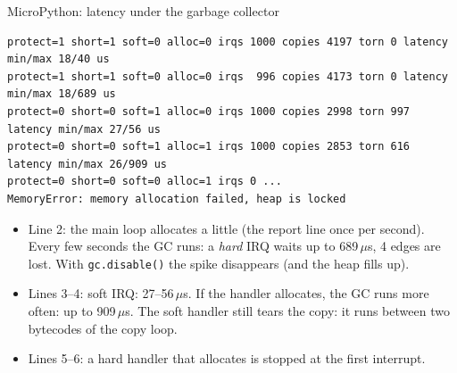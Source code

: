 \begin{frame}[fragile]{MicroPython: latency under the garbage collector}
  \footnotesize
\begin{verbatim}
protect=1 short=1 soft=0 alloc=0 irqs 1000 copies 4197 torn 0 latency min/max 18/40 us
protect=1 short=1 soft=0 alloc=0 irqs  996 copies 4173 torn 0 latency min/max 18/689 us
protect=0 short=0 soft=1 alloc=0 irqs 1000 copies 2998 torn 997 latency min/max 27/56 us
protect=0 short=0 soft=1 alloc=1 irqs 1000 copies 2853 torn 616 latency min/max 26/909 us
protect=0 short=0 soft=0 alloc=1 irqs 0 ...
MemoryError: memory allocation failed, heap is locked
\end{verbatim}
  \small
  \begin{itemize}
    \item Line 2: the main loop allocates a little (the report line once per second). Every few seconds the GC runs: a \emph{hard} IRQ waits up to 689\,$\mu$s, 4 edges are lost. With \texttt{gc.disable()} the spike disappears (and the heap fills up).
    \item Lines 3--4: soft IRQ: 27--56\,$\mu$s. If the handler allocates, the GC runs more often: up to 909\,$\mu$s. The soft handler still tears the copy: it runs between two bytecodes of the copy loop.
    \item Lines 5--6: a hard handler that allocates is stopped at the first interrupt.
  \end{itemize}
\end{frame}

